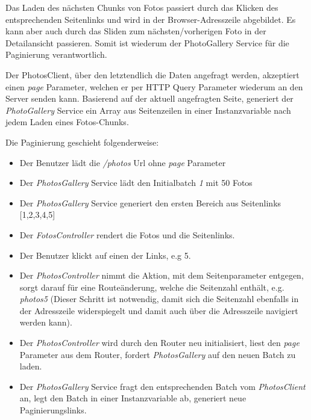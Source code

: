 Das Laden des nächsten Chunks von Fotos passiert durch das Klicken des entsprechenden Seitenlinks und wird in der Browser-Adresszeile abgebildet. Es kann aber auch durch das Sliden zum nächsten/vorherigen Foto in der Detailansicht passieren. Somit ist wiederum der PhotoGallery Service für die Paginierung verantwortlich.

Der PhotosClient, über den letztendlich die Daten angefragt werden, akzeptiert einen \textit{page} Parameter, welchen er per HTTP Query Parameter wiederum an den Server senden kann. Basierend auf der aktuell angefragten Seite, generiert der \textit{PhotoGallery} Service ein Array aus Seitenzeilen in einer Instanzvariable nach jedem Laden eines Fotos-Chunks.

Die Paginierung geschieht folgenderweise:

\begin{itemize}
  \item Der Benutzer lädt die \textit{/photos} Url ohne \textit{page} Parameter
  \item Der \textit{PhotosGallery} Service lädt den Initialbatch \textit{1} mit 50 Fotos
  \item Der \textit{PhotosGallery} Service generiert den ersten Bereich aus Seitenlinks [1,2,3,4,5]
  \item Der \textit{FotosController} rendert die Fotos und die Seitenlinks.
  \item Der Benutzer klickt auf einen der Links, e.g 5.
  \item Der \textit{PhotosController} nimmt die Aktion, mit dem Seitenparameter entgegen, sorgt darauf für eine Routeänderung, welche die Seitenzahl enthält, e.g. \textit{\/photos\/5}
  (Dieser Schritt ist notwendig, damit sich die Seitenzahl ebenfalls in der Adresszeile widerspiegelt und damit auch über die Adresszeile navigiert werden kann).
  \item Der \textit{PhotosController} wird durch den Router neu initialisiert, liest den \textit{page} Parameter aus dem Router, fordert \textit{PhotosGallery} auf den neuen Batch zu laden.
  \item Der \textit{PhotosGallery} Service fragt den entsprechenden Batch vom \textit{PhotosClient} an, legt den Batch in einer Instanzvariable ab, generiert neue Paginierungslinks.
\end{itemize}

